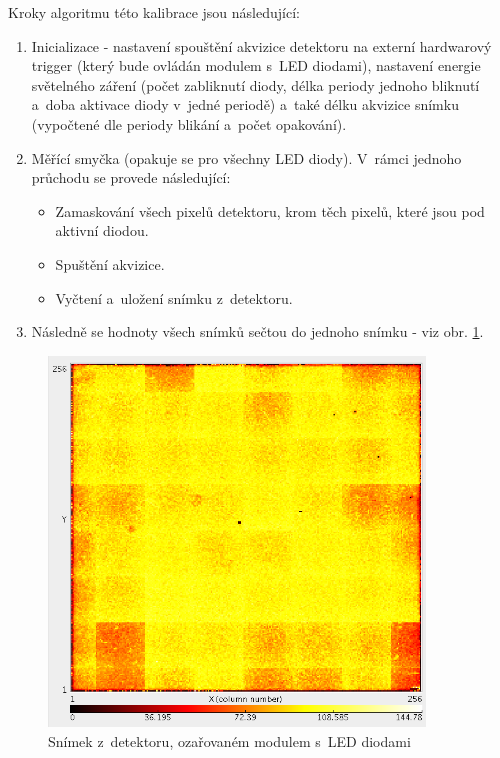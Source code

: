 Kroky algoritmu této kalibrace jsou následující:
\begin{enumerate}
	\item Inicializace - nastavení spouštění akvizice detektoru na externí hardwarový trigger (který bude ovládán modulem s~LED diodami), nastavení energie světelného záření (počet zabliknutí diody, délka periody jednoho bliknutí a~doba aktivace diody v~jedné periodě) a~také délku akvizice snímku (vypočtené dle periody blikání a~počet opakování).
	\item Měřící smyčka (opakuje se pro všechny LED diody). V~rámci jednoho průchodu se provede následující:
		\begin{itemize}
			\item Zamaskování všech pixelů detektoru, krom těch pixelů, které jsou pod aktivní diodou.
			\item Spuštění akvizice.
			\item Vyčtení a~uložení snímku z~detektoru.
		\end{itemize}
	\item Následně se hodnoty všech snímků sečtou do jednoho snímku - viz obr. \ref{fig:calib:led_frame}.
\end{enumerate}

\begin{figure}[th]
	\begin{center}
		\includegraphics[width=10cm]{figures/led_calib_frame.png}
		\caption{Snímek z~detektoru, ozařovaném modulem s~LED diodami}
		\label{fig:calib:led_frame}
	\end{center}
\end{figure}

